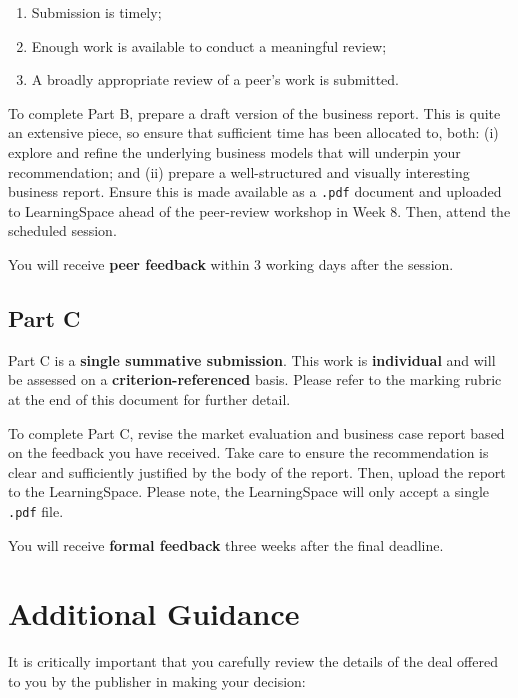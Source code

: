 \documentclass{../../fal_assignment}
\begin{document}
\begin{enumerate}[label=(\alph*)]
	\item Submission is timely;
	\item Enough work is available to conduct a meaningful review;
	\item A broadly appropriate review of a peer's work is submitted.
\end{enumerate}

To complete Part B, prepare a draft version of the business report. This is quite an extensive piece, so ensure that sufficient time has been allocated to, both: (i) explore and refine the underlying business models that will underpin your recommendation; and (ii) prepare a well-structured and visually interesting business report. Ensure this is made available as a \texttt{.pdf} document and uploaded to LearningSpace ahead of the peer-review workshop in Week 8. Then, attend the scheduled session.

You will receive \textbf{peer feedback} within 3 working days after the session.

\subsection*{Part C}

Part C is a \textbf{single summative submission}. This work is \textbf{individual} and will be assessed on a \textbf{criterion-referenced} basis. Please refer to the marking rubric at the end of this document for further detail.

To complete Part C, revise the market evaluation and business case report based on the feedback you have received. Take care to ensure the recommendation is clear and sufficiently justified by the body of the report. Then, upload the report to the LearningSpace. Please note, the LearningSpace will only accept a single \texttt{.pdf} file.

You will receive \textbf{formal feedback} three weeks after the final deadline.

\section*{Additional Guidance}

It is critically important that you carefully review the details of the deal offered to you by the publisher in making your decision:
\end{document}
